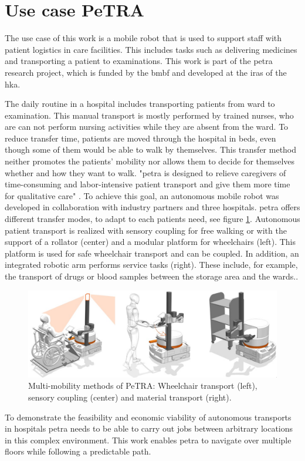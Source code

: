 \section{Use case PeTRA}
\label{sec:use_case}
The use case of this work is a mobile robot that is used to support staff with patient logistics in care facilities. This includes tasks such as delivering medicines and transporting a patient to examinations. This work is part of the \gls{petra} research project, which is funded by the \gls{bmbf} \cite{bmbf-internetredaktion_bekanntmachung_2018} and developed at the \gls{iras} of the \gls{hka}.

The daily routine in a hospital includes transporting patients from ward to examination. This manual transport is mostly performed by trained nurses, who are can not perform nursing activities while they are absent from the ward. To reduce transfer time, patients are moved through the hospital in beds, even though some of them would be able to walk by themselves. This transfer method neither promotes the patients' mobility nor allows them to decide for themselves whether and how they want to walk. "\Gls{petra} is designed to relieve caregivers of time-consuming and labor-intensive patient transport and give them more time for qualitative care" \cite{petra-konsortium_personen-transfer_2022}. To achieve this goal, an autonomous mobile robot was developed in collaboration with industry partners and three hospitals. \Gls{petra} offers different transfer modes, to adapt to each patients need, see figure  \ref{fig:multi_mobility_methods}. Autonomous patient transport is realized with sensory coupling for free walking or with the support of a rollator (center) and a modular platform for wheelchairs (left). This platform is used for safe wheelchair transport and can be coupled. In addition, an integrated robotic arm performs service tasks (right). These include, for example, the transport of drugs or blood samples between the storage area and the wards..

\begin{figure}[h]
\includegraphics[width=\textwidth]{figures/02_state_of_the_art/PeTRA_transport_modes.jpg}
\caption[]{Multi-mobility methods of PeTRA: Wheelchair transport (left), sensory coupling (center) and material transport (right).}
\centering
\label{fig:multi_mobility_methods}
\end{figure}
To demonstrate the feasibility and economic viability of autonomous transports in hospitals \gls{petra} needs to be able to carry out jobs between arbitrary locations in this complex environment. This work enables \gls{petra} to navigate over multiple floors while following a predictable path.

